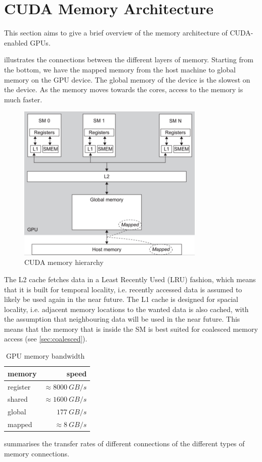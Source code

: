 \section{CUDA Memory Architecture}
\label{sec:cuda memory architecture}

This section aims to give a brief overview of the memory architecture of CUDA-enabled GPUs.

 illustrates the connections between the different layers of memory.
Starting from the bottom, we have the mapped memory from the host machine to global memory on the GPU device.
The global memory of the device is the slowest on the device.
As the memory moves towards the cores, access to the memory is much faster.

\begin{figure}[htb]
  \centering
  \includegraphics[height=7.5cm]{graphics/images/cuda-mem-hierarchy.png}
  \caption{CUDA memory hierarchy~\cite{farber2011cuda}}
  \label{fig:cpu gpu communication}
\end{figure}

The L2 cache fetches data in a Least Recently Used (LRU) fashion, which means that it is built for temporal locality, i.e. recently accessed data is assumed to likely be used again in the near future.
The L1 cache is designed for spacial locality, i.e. adjacent memory locations to the wanted data is also cached, with the assumption that neighbouring data will be used in the near future.
This means that the memory that is inside the SM is best suited for coalesced memory access (see \cref{sec:coalesced}).


\begin{table}[htb]
  \centering
  \begin{tabular}{l r}
    \toprule
    memory & speed \\
    \midrule
    register & $\approx \SI{8000}{GB/s}$ \\
    shared   & $\approx \SI{1600}{GB/s}$ \\
    global   & $\SI{177}{GB/s}$ \\
    mapped   & $\approx \SI{8}{GB/s}$ \\
  \end{tabular}
  \caption{GPU memory bandwidth~\cite{farber2011cuda}}
  \label{tab:hardware connections transfer rates}
\end{table}

 summarises the transfer rates of different connections of the different types of memory connections.
